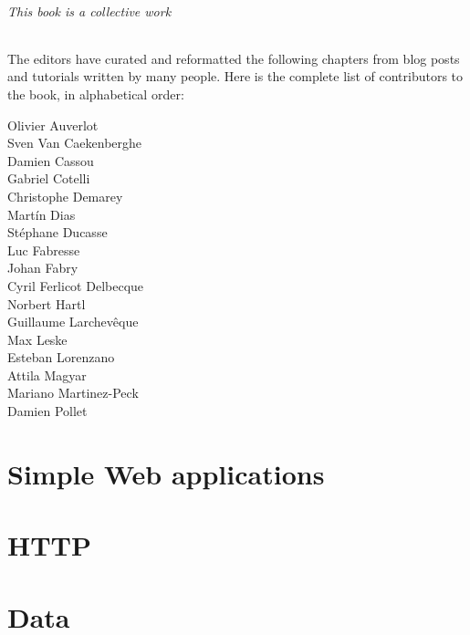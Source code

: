 \documentclass[10pt,twoside,english,showtrims]{support/latex/sbabook/sbabook}
\begin{document}
\paragraph{This book is a collective work}
The editors have curated and reformatted the following chapters from blog posts
and tutorials written by many people. Here is the complete list of contributors
to the book, in alphabetical order:

\begin{multicols}{3}
Olivier Auverlot\\
Sven Van Caekenberghe\\
Damien Cassou\\
Gabriel Cotelli\\
Christophe Demarey\\
Martín Dias\\
Stéphane Ducasse\\
Luc Fabresse\\
Johan Fabry\\
Cyril Ferlicot Delbecque\\
Norbert Hartl\\
Guillaume Larchevêque\\
Max Leske\\
Esteban Lorenzano\\
Attila Magyar\\
Mariano Martinez-Peck\\
Damien Pollet\\
\end{multicols}

\tableofcontents*
\clearpage\listoffigures

\mainmatter

\part{Simple Web applications}



\part{HTTP}





\part{Data}





\end{document}
